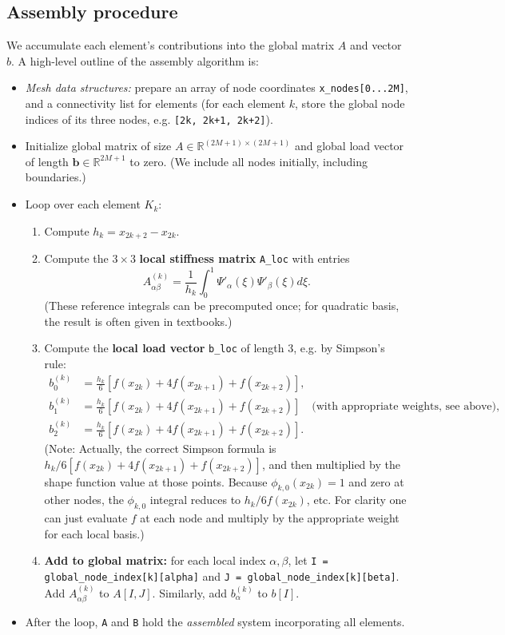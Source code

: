 \documentclass[a4paper,10pt]{article}
\begin{document}
\subsection*{Assembly procedure}
We accumulate each element's contributions into the global matrix \(A\) and vector \(b\). A high-level outline of the assembly algorithm is:
\begin{itemize}
	\item \emph{Mesh data structures:} 
	prepare an array of node coordinates \texttt{x_nodes[0...2M]}, and a connectivity list for elements (for each element \(k\), store the global node indices of its three nodes, e.g. \texttt{[2k, 2k+1, 2k+2]}).
	\item Initialize global matrix of size \(A \in \mathbb{R}^{(2M+1)\times(2M+1)}\) and global load vector of length \(\mathbf{b} \in \mathbb{R}^{2M+1}\) to zero. 
	(We include all nodes initially, including boundaries.)
	\item Loop over each element \(K_k\):
	      \begin{enumerate}
		      \item Compute \(h_k = x_{2k+2} - x_{2k}\).
		      \item  Compute the \(3 \times 3\) \textbf{local stiffness matrix} \texttt{A_loc} with entries
		            \[A^{(k)}_{\alpha\beta} = \frac{1}{h_k}\int_0^1 \Psi'_{\alpha}(\xi)\Psi'_{\beta}(\xi)d\xi.\]
		            (These reference integrals can be precomputed once; for quadratic basis, the result is often given in textbooks.)
		      \item Compute the \textbf{local load vector} \texttt{b_loc} of length 3, e.g. by Simpson's rule:
			  		\begin{align*}			  			
		            b^{(k)}_0 &= \frac{h_k}{6}[f(x_{2k}) + 4f(x_{2k+1}) + f(x_{2k+2})],\\
		            b^{(k)}_1 &= \frac{h_k}{6}[f(x_{2k}) + 4f(x_{2k+1}) + f(x_{2k+2})] \quad\text{(with appropriate weights, see above)},\\
		            b^{(k)}_2 &= \frac{h_k}{6}[f(x_{2k}) + 4f(x_{2k+1}) + f(x_{2k+2})].
					\end{align*}
		            (Note: Actually, the correct Simpson formula is \(h_k/6 [f(x_{2k}) + 4f(x_{2k+1}) + f(x_{2k+2})]\), and then multiplied by the shape function value at those points.
		            Because \(\phi_{k,0}(x_{2k})=1\) and zero at other nodes, the \(\phi_{k,0}\) integral reduces to \(h_k/6 f(x_{2k})\), etc.
		            For clarity one can just evaluate \(f\) at each node and multiply by the appropriate weight for each local basis.)
		      \item \textbf{Add to global matrix:} for each local index \(\alpha,\beta\), let \texttt{I = global_node_index[k][alpha]} and \texttt{J = global_node_index[k][beta]}.
		            Add \(A^{(k)}_{\alpha\beta}\) to \(A[I,J]\).
		            Similarly, add \(b^{(k)}_{\alpha}\) to \(b[I]\).
	      \end{enumerate}
	\item  After the loop, \texttt{A} and \texttt{B} hold the \emph{assembled} system incorporating all elements.
\end{itemize}
\end{document}
